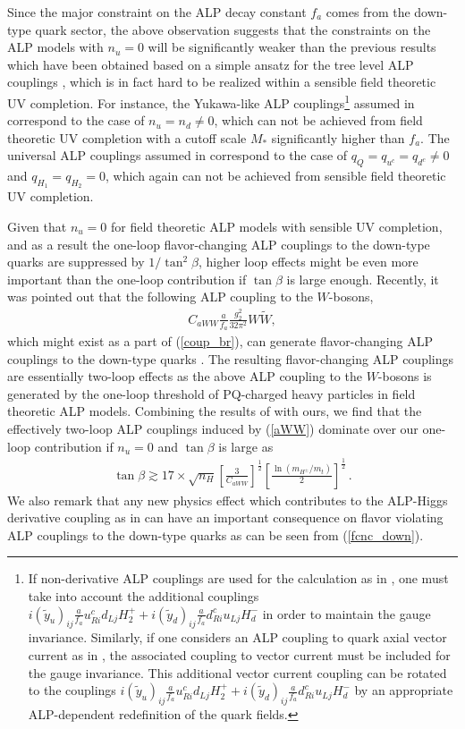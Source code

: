 \documentclass[preprint,prd,aps,tighten,nofootinbib,amssymb]{revtex4}
\newcommand{\bea}{\begin{eqnarray}}
\newcommand{\eea}{\end{eqnarray}}
\newcommand{\dis}[1]{\begin{equation}\begin{split}#1\end{split}\end{equation}}
\def\vpq{f_{a}}
\begin{document}
Since the major constraint on the ALP decay constant $\vpq$ comes from  the down-type quark sector, the above observation suggests that the constraints on the ALP models with $n_u = 0$ will be significantly weaker than the previous results which have been obtained  based on a simple ansatz for the tree level ALP couplings \cite{Batell:2009jf, Dolan:2014ska}, which is in fact hard to be realized within a sensible field theoretic UV completion.
For instance, the Yukawa-like ALP couplings\footnote{If non-derivative ALP couplings are used for the calculation as in \cite{Dolan:2014ska}, one must take into account the additional couplings  $i (\tilde{y}_u)_{ij} \frac{a}{\vpq} u_{R i}^c d_{L j} H_2^+ + i (\tilde{y}_d)_{ij} \frac{a}{\vpq} d_{R i}^c u_{L j} H_d^-$  in order to maintain the gauge invariance.
Similarly, if one considers  an ALP coupling to quark axial vector  current as in \cite{Batell:2009jf}, the associated coupling to vector current must be included for the gauge invariance.
This additional vector current coupling can be rotated to the couplings  $i (\tilde{y}_u)_{ij} \frac{a}{\vpq} u_{R i}^c d_{L j} H_2^+ + i (\tilde{y}_d)_{ij} \frac{a}{\vpq} d_{R i}^c u_{L j} H_d^-$ by an appropriate ALP-dependent redefinition of the quark fields.} assumed  in \cite{Dolan:2014ska} correspond to the case of $n_u = n_d \neq 0$, which can not be achieved from field theoretic UV completion with a cutoff scale $M_*$ significantly higher than $f_a$. 
The universal ALP couplings assumed in \cite{Batell:2009jf} correspond to the case of $ q_Q=q_{u^c} = q_{d^c} \neq 0$ and $q_{H_1} = q_{H_2} = 0$, which again can not be achieved from sensible field theoretic UV completion.

Given that $n_u=0$ for field theoretic ALP models with sensible UV completion, and as a result the one-loop flavor-changing ALP couplings to the down-type quarks  are suppressed by $1/\tan^2 \beta$, higher loop effects might be even more important than the one-loop contribution if $\tan \beta$ is large enough. 
Recently, it was pointed out that the following ALP coupling to  the $W$-bosons, 
\dis{
\label{aWW}
C_{aWW} \frac{a}{\vpq} \frac{g_2^2}{32\pi^2} W \widetilde{W},
}
which might exist as a part of  (\ref{coup_br}), can generate flavor-changing ALP couplings  to the down-type quarks \cite{Izaguirre:2016dfi}.
The resulting flavor-changing ALP couplings are essentially two-loop effects as the above ALP coupling to the $W$-bosons is generated by the one-loop threshold of PQ-charged heavy particles in field theoretic ALP models. 
Combining the results of \cite{Izaguirre:2016dfi} with ours, we find that the effectively two-loop ALP couplings induced by
(\ref{aWW}) dominate over our one-loop contribution if $n_u=0$ and $\tan\beta$ is large as
\bea
\label{2-loop_tb}
\tan\beta \gtrsim 17  \times \sqrt{n_H} \left[\frac{3}{C_{aWW}}\right]^{\frac{1}{2}} \left[\frac{\ln (m_{H^{\pm}}/m_t)}{2}\right]^{\frac{1}{2}} \, .
\eea 
We also remark that any new physics effect which contributes to the ALP-Higgs derivative coupling as in \cite{Bauer:2017nlg} can have an important consequence on flavor violating ALP couplings to the down-type quarks as can be seen from (\ref{fcnc_down}).
\end{document}
